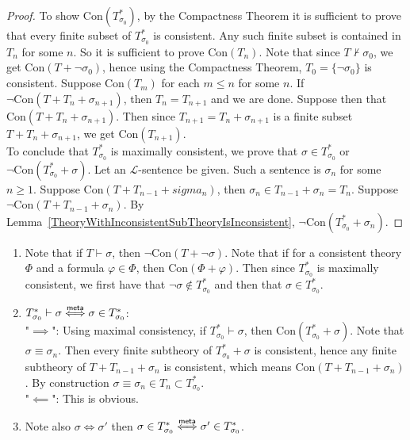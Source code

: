 \begin{proof}
    To show $\mathrm{Con}(T^\ast_{\sigma_0})$, by the Compactness Theorem it is sufficient to prove that every finite subset of $T_{\sigma_0}^\ast$ is consistent. Any such finite subset is contained in $T_n$ for some $n$. So it is sufficient to prove $\mathrm{Con}(T_n)$. Note that since $T\not\vdash \sigma_0$, we get $\mathrm{Con}(T+\neg\sigma_0)$, hence using the Compactness Theorem, $T_0=\{\neg\sigma_0\}$ is consistent. Suppose $\mathrm{Con}(T_m)$ for each $m\leq n$ for some $n$. If $\neg\mathrm{Con}(T+T_{n}+\sigma_{n+1})$, then $T_n=T_{n+1}$ and we are done. Suppose then that $\mathrm{Con}(T+T_n+\sigma_{n+1})$. Then since $T_{n+1}=T_n+\sigma_{n+1}$ is a finite subset $T+T_n+\sigma_{n+1}$, we get $\mathrm{Con}(T_{n+1})$.\\
    To conclude that $T^\ast_{\sigma_0}$ is maximally consistent, we prove that $\sigma\in T^\ast_{\sigma_0}$ or $\neg\mathrm{Con}(T^\ast_{\sigma_0}+\sigma)$. Let an $\mathcal{L}$-sentence be given. Such a sentence is $\sigma_n$ for some $n\geq 1$. Suppose $\mathrm{Con}(T+T_{n-1}+sigma_n)$, then $\sigma_n\in T_{n-1}+\sigma_n=T_n$. Suppose $\neg\mathrm{Con}(T+T_{n-1}+\sigma_n)$. By Lemma~\ref{TheoryWithInconsistentSubTheoryIsInconsistent}, $\neg\mathrm{Con}(T^\ast_{\sigma_0}+\sigma_n)$. 
\end{proof}
\begin{remark}\label{RemarkAboutMaximallyConsistentExtensions}
    \begin{enumerate}
        \item Note that if $T \vdash \sigma$, then $\neg\mathrm{Con}(T+\neg\sigma)$. Note that if for a consistent theory $\Phi$ and a formula $\varphi\in \Phi$, then $\mathrm{Con}(\Phi+\varphi)$. Then since $T^\ast_{\sigma_0}$ is maximally consistent, we first have that $\neg \sigma\notin T^\ast_{\sigma_0}$ and then that $\sigma \in T^\ast_{\sigma_0}$.
        \item $T^\ast_{\sigma_0}\vdash \sigma \mathrel{\overset{\mathsf{meta}}{\Longleftrightarrow}} \sigma\in T^\ast_{\sigma_0}$:\\ 
        "$\implies$": Using maximal consistency, if $T^\ast_{\sigma_0}\vdash \sigma$, then $\mathrm{Con}(T^\ast_{\sigma_0}+\sigma)$. Note that $\sigma\equiv \sigma_n$. Then every finite subtheory of $T^\ast_{\sigma_0}+\sigma$ is consistent, hence any finite subtheory of $T+T_{n-1}+\sigma_n$ is consistent, which means $\mathrm{Con}(T+T_{n-1}+\sigma_n)$. By construction $\sigma\equiv \sigma_n\in T_n\subset T^\ast_{\sigma_0}$.\\
        "$\impliedby$":  This is obvious. 
        \item Note also $\sigma\iff \sigma'$ then $\sigma\in T^\ast_{\sigma_0} \mathrel{\overset{\mathsf{meta}}{\Longleftrightarrow}} \sigma'\in T^\ast_{\sigma_0}$. 
    \end{enumerate}
\end{remark}
